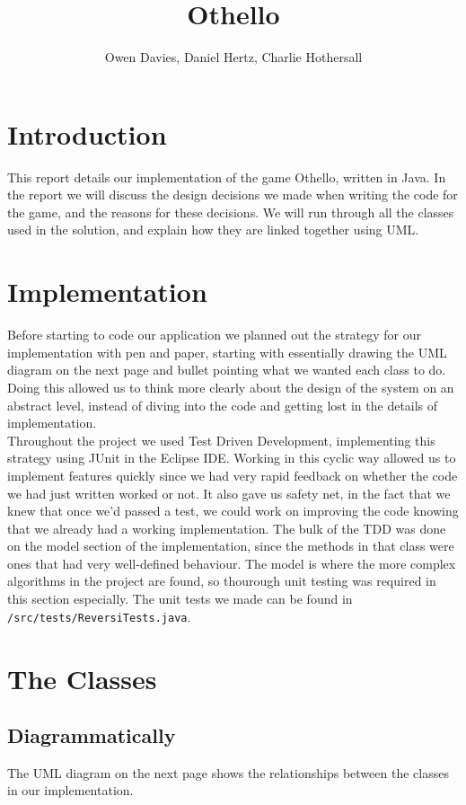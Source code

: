 \documentclass[11pt,a4paper,oneside]{article}
\title{Othello}
\author{Owen Davies, Daniel Hertz, Charlie Hothersall}
\begin{document}
\maketitle

\section*{Introduction}
This report details our implementation of the game Othello, written in Java. In the report we will discuss the design decisions we made when writing the code for the game, and the reasons for these decisions. We will run through all the classes used in the solution, and explain how they are linked together using UML. 

\section*{Implementation}
Before starting to code our application we planned out the strategy for our implementation with pen and paper, starting with essentially drawing the UML diagram on the next page and bullet pointing what we wanted each class to do. Doing this allowed us to think more clearly about the design of the system on an abstract level, instead of diving into the code and getting lost in the details of implementation.\\
\indent Throughout the project we used Test Driven Development, implementing this strategy using JUnit in the Eclipse IDE. Working in this cyclic way allowed us to implement features quickly since we had very rapid feedback on whether the code we had just written worked or not. It also gave us safety net, in the fact that we knew that once we'd passed a test, we could work on improving the code knowing that we already had a working implementation. The bulk of the TDD was done on the model section of the implementation, since the methods in that class were ones that had very well-defined behaviour. The model is where the more complex algorithms in the project are found, so thourough unit testing was required in this section especially. The unit tests we made can be found in \texttt{/src/tests/ReversiTests.java}.

\section*{The Classes}

\subsection*{Diagrammatically}
The UML diagram on the next page shows the relationships between the classes in our implementation.
\end{document}
